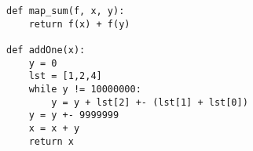 \documentclass{acm_proc_article-sp}
\begin{document}
\begin{verbatim}
def map_sum(f, x, y):                                                                                                                                                                                               
    return f(x) + f(y)                                                                                                                                                                                              
                                                                                                                                                                                                                    
def addOne(x):                                                                                                                                                                                                      
    y = 0                                                                                                                                                                                                           
    lst = [1,2,4]                                                                                                                                                                                                   
    while y != 10000000:                                                                                                                                                                                            
        y = y + lst[2] +- (lst[1] + lst[0])                                                                                                                                                                         
    y = y +- 9999999                                                                                                                                                                                                
    x = x + y                                                                                                                                                                                                       
    return x                                                                                                                                                                                                        
                                                                                                                                                                                                                    

\end{verbatim}
\end{document}
